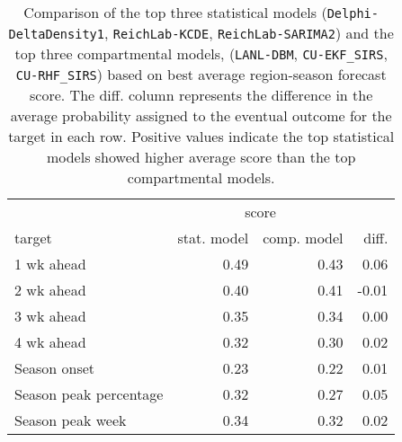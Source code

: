 \begin{table}[ht]
\centering
\begin{tabular}{lrrr}
   \hline 
 & \multicolumn{2}{c}{score} &  \\
target & stat. model & comp. model & diff. \\ 
  \hline
1 wk ahead & 0.49 & 0.43 & 0.06 \\ 
  2 wk ahead & 0.40 & 0.41 & -0.01 \\ 
  3 wk ahead & 0.35 & 0.34 & 0.00 \\ 
  4 wk ahead & 0.32 & 0.30 & 0.02 \\ 
  Season onset & 0.23 & 0.22 & 0.01 \\ 
  Season peak percentage & 0.32 & 0.27 & 0.05 \\ 
  Season peak week & 0.34 & 0.32 & 0.02 \\ 
   \hline
\end{tabular}
\caption{Comparison of the top three statistical models ({\tt Delphi-DeltaDensity1}, {\tt ReichLab-KCDE}, {\tt ReichLab-SARIMA2}) and the top three compartmental models, ({\tt LANL-DBM}, {\tt CU-EKF\_SIRS}, {\tt CU-RHF\_SIRS}) based on best average region-season forecast score. The diff. column represents the difference in the average probability assigned to the eventual outcome for the target in each row. Positive values indicate the top statistical models showed higher average score than the top compartmental models.} 
\label{tab:score-by-model-type}
\end{table}

